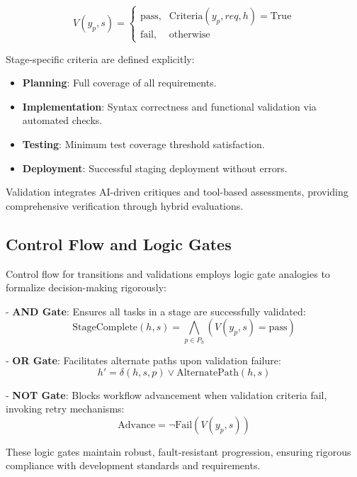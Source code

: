\documentclass[11pt,a4paper]{article}
\begin{document}
\[
V(y_p, s) =
\begin{cases}
    \text{pass}, & \text{Criteria}(y_p, req, h)=\text{True}\\[4pt]
    \text{fail}, & \text{otherwise}
\end{cases}
\]

Stage-specific criteria are defined explicitly:

\begin{itemize}
    \item \textbf{Planning}: Full coverage of all requirements.
    \item \textbf{Implementation}: Syntax correctness and functional validation via automated checks.
    \item \textbf{Testing}: Minimum test coverage threshold satisfaction.
    \item \textbf{Deployment}: Successful staging deployment without errors.
\end{itemize}

Validation integrates AI-driven critiques and tool-based assessments, providing comprehensive verification through hybrid evaluations.

\subsection{Control Flow and Logic Gates}
\label{subsec:control_flow}

Control flow for transitions and validations employs logic gate analogies to formalize decision-making rigorously:

- \textbf{AND Gate}: Ensures all tasks in a stage are successfully validated:
\[
\text{StageComplete}(h, s) = \bigwedge_{p \in P_h}(V(y_p, s)=\text{pass})
\]

- \textbf{OR Gate}: Facilitates alternate paths upon validation failure:
\[
h' = \delta(h, s, p) \lor \text{AlternatePath}(h, s)
\]

- \textbf{NOT Gate}: Blocks workflow advancement when validation criteria fail, invoking retry mechanisms:
\[
\text{Advance} = \neg\text{Fail}(V(y_p, s))
\]

These logic gates maintain robust, fault-resistant progression, ensuring rigorous compliance with development standards and requirements.

\end{document}
